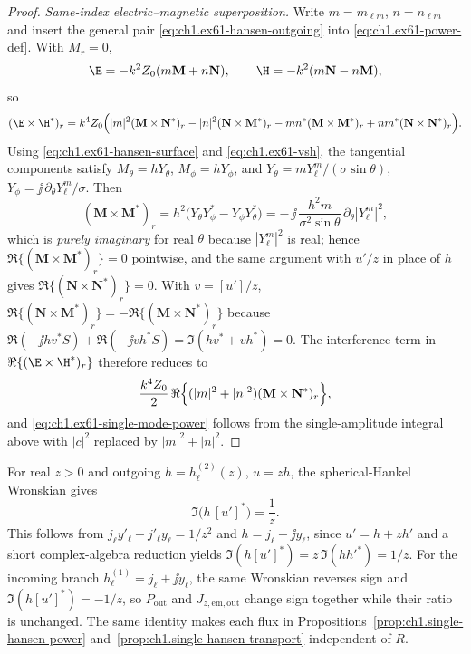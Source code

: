 \begin{proof}
\medskip\noindent\emph{Same-index electric--magnetic superposition.}
Write $m=m_{\ell m}$, $n=n_{\ell m}$ and insert the general pair \eqref{eq:ch1.ex61-hansen-outgoing} into \eqref{eq:ch1.ex61-power-def}. With $M_r=0$,
\[
\E=-k^2 Z_0(m\mathbf M+n\mathbf N),\qquad
\H=-k^2(m\mathbf N-n\mathbf M),
\]
so
\[
(\E\times\H^*)_r
=k^4 Z_0\Bigl(|m|^2(\mathbf M\times\mathbf N^*)_r
-|n|^2(\mathbf N\times\mathbf M^*)_r
-mn^*(\mathbf M\times\mathbf M^*)_r
+n m^*(\mathbf N\times\mathbf N^*)_r\Bigr).
\]
Using \eqref{eq:ch1.ex61-hansen-surface} and \eqref{eq:ch1.ex61-vsh}, the tangential components satisfy $M_\theta=hY_\theta$, $M_\phi=hY_\phi$, and $Y_\theta=m Y_\ell^m/(\sigma\sin\theta)$, $Y_\phi=\jj\,\partial_\theta Y_\ell^m/\sigma$. Then
\[
(\mathbf M\times\mathbf M^*)_r
=h^2\bigl(Y_\theta Y_\phi^*-Y_\phi Y_\theta^*\bigr)
=-\,\jj\,\frac{h^2 m}{\sigma^2\sin\theta}\,\partial_\theta|Y_\ell^m|^2,
\]
which is \emph{purely imaginary} for real $\theta$ because $|Y_\ell^m|^2$ is real; hence $\Re\{(\mathbf M\times\mathbf M^*)_r\}=0$ pointwise, and the same argument with $u'/z$ in place of $h$ gives $\Re\{(\mathbf N\times\mathbf N^*)_r\}=0$. With $v=[u']/z$, $\Re\{(\mathbf N\times\mathbf M^*)_r\}=-\Re\{(\mathbf M\times\mathbf N^*)_r\}$ because $\Re(-\jj h v^* S)+\Re(-\jj v h^* S)=\Im(h v^*+v h^*)=0$. The interference term in $\Re\{(\E\times\H^*)_r\}$ therefore reduces to
\[
\frac{k^4 Z_0}{2}\,\Re\Bigl\{(|m|^2+|n|^2)(\mathbf M\times\mathbf N^*)_r\Bigr\},
\]
and \eqref{eq:ch1.ex61-single-mode-power} follows from the single-amplitude integral above with $|c|^2$ replaced by $|m|^2+|n|^2$.
\end{proof}

For real $z>0$ and outgoing $h=h_\ell^{(2)}(z)$, $u=zh$, the spherical-Hankel Wronskian gives
\begin{equation}
\label{eq:ch1.ex61-hankel-wronskian}
\Im\bigl(h\,[u']^*\bigr)=\frac{1}{z}.
\end{equation}
This follows from $j_\ell y'_\ell-j'_\ell y_\ell=1/z^2$ and $h=j_\ell-\jj y_\ell$, since $u'=h+zh'$ and a short complex-algebra reduction yields $\Im(h[u']^*)=z\,\Im(hh'^*)=1/z$. For the incoming branch $h_\ell^{(1)}=j_\ell+\jj y_\ell$, the same Wronskian reverses sign and $\Im(h[u']^*)=-1/z$, so $P_{\mathrm{out}}$ and $\dot J_{z,\mathrm{em,out}}$ change sign together while their ratio is unchanged. The same identity makes each flux in Propositions~\ref{prop:ch1.single-hansen-power} and~\ref{prop:ch1.single-hansen-transport} independent of $R$.

